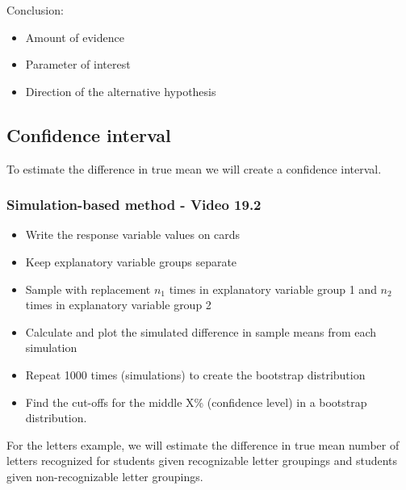 \documentclass[
]{report}
\begin{document}
\vspace{0.8in}

Conclusion:

\begin{itemize}
\item
  Amount of evidence
\item
  Parameter of interest
\item
  Direction of the alternative hypothesis
\end{itemize}

\vspace{0.6in}

\newpage

\subsection*{Confidence interval}\label{confidence-interval-6}

To estimate the difference in true mean we will create a confidence interval.

\subsubsection*{Simulation-based method - Video 19.2}\label{simulation-based-method---video-19.2}

\begin{itemize}
\item
  Write the response variable values on cards
\item
  Keep explanatory variable groups separate
\item
  Sample with replacement \(n_1\) times in explanatory variable group 1 and \(n_2\) times in explanatory variable group 2
\item
  Calculate and plot the simulated difference in sample means from each simulation
\item
  Repeat 1000 times (simulations) to create the bootstrap distribution
\item
  Find the cut-offs for the middle X\% (confidence level) in a bootstrap distribution.
\end{itemize}

For the letters example, we will estimate the difference in true mean number of letters recognized for students given recognizable letter groupings and students given non-recognizable letter groupings.
\end{document}
